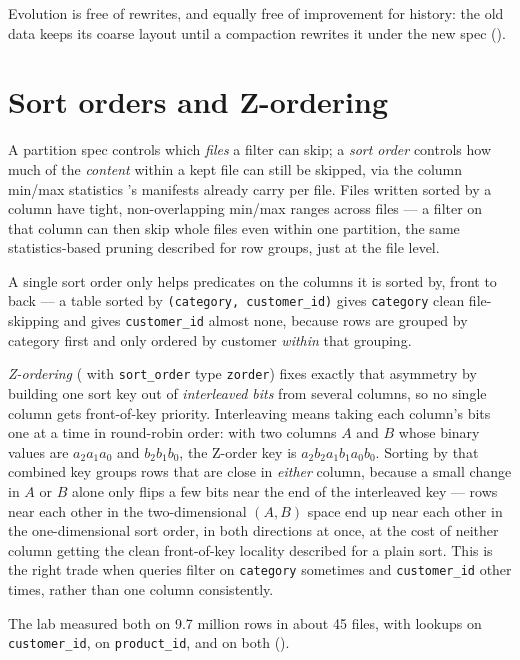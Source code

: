 Evolution is free of rewrites, and equally free of improvement for history: the
old data keeps its coarse layout until a compaction rewrites it under the new
spec ().

\section{Sort orders and Z-ordering}
\label{sec:ice-sort-order}

A partition spec controls which \emph{files} a filter can skip; a
\emph{sort order} controls how much of the \emph{content} within a kept file
can still be skipped, via the column min/max statistics
's manifests already carry per file. Files written
sorted by a column have tight, non-overlapping min/max ranges across files ---
a filter on that column can then skip whole files even within one partition,
the same statistics-based pruning  described for row
groups, just at the file level.

A single sort order only helps predicates on the columns it is sorted by,
front to back --- a table sorted by \texttt{(category, customer\_id)} gives
\texttt{category} clean file-skipping and gives \texttt{customer\_id} almost
none, because rows are grouped by category first and only ordered by
customer \emph{within} that grouping.

\emph{Z-ordering} ( with \texttt{sort\_order}
type \texttt{zorder}) fixes exactly that asymmetry by building one sort key
out of \emph{interleaved bits} from several columns, so no single column
gets front-of-key priority. Interleaving means taking each column's bits one
at a time in round-robin order: with two columns $A$ and $B$ whose binary
values are $a_2a_1a_0$ and $b_2b_1b_0$, the Z-order key is
$a_2b_2a_1b_1a_0b_0$. Sorting by that combined key groups rows that are
close in \emph{either} column, because a small change in $A$ or $B$ alone
only flips a few bits near the end of the interleaved key --- rows near
each other in the two-dimensional $(A, B)$ space end up near each other in
the one-dimensional sort order, in both directions at once, at the cost of
neither column getting the clean front-of-key locality 
described for a plain sort. This is the right trade when queries filter on
\texttt{category} sometimes and \texttt{customer\_id} other times, rather
than one column consistently.

The lab measured both on 9.7 million rows in about 45 files, with lookups on
\texttt{customer\_id}, on \texttt{product\_id}, and on both
().

